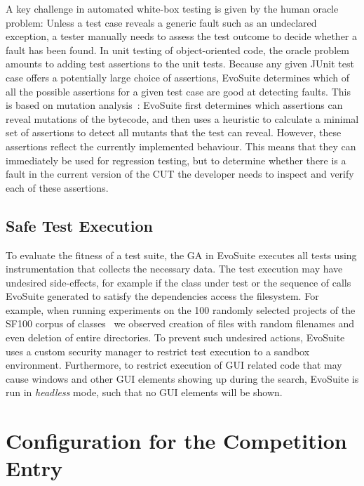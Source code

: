 \documentclass[10pt,conference,compsocconf]{IEEEtran}
\newcommand{\EVOSUITE}{{\sc EvoSuite}\xspace}
\newcommand{\CS}{{\sc SF100}\xspace}
\begin{document}
A key challenge in automated white-box testing is given by the human
oracle problem: Unless a test case reveals a generic fault such as an
undeclared exception, a tester manually needs to assess the test
outcome to decide whether a fault has been found. In unit testing of
object-oriented code, the oracle problem amounts to adding test
assertions to the unit tests. Because any given JUnit test case offers
a potentially large choice of assertions, \EVOSUITE determines which
of all the possible assertions for a given test case are good at
detecting faults. This is based on mutation
analysis~\cite{10.1109/TSE.2011.93}: \EVOSUITE first determines which
assertions can reveal mutations of the bytecode, and then uses a
heuristic to calculate a minimal set of assertions to detect all
mutants that the test can reveal. However, these assertions reflect
the currently implemented behaviour. This means that they can
immediately be used for regression testing, but to determine whether
there is a fault in the current version of the CUT the developer needs
to inspect and verify each of these assertions.

\subsection{Safe Test Execution}

To evaluate the fitness of a test suite, the GA in \EVOSUITE executes
all tests using instrumentation that collects the necessary data. The
test execution may have undesired side-effects, for example if the
class under test or the sequence of calls \EVOSUITE generated to
satisfy the dependencies access the filesystem. For example, when
running experiments on the 100 randomly selected projects of the \CS
corpus of classes~\cite{FrA12b} we observed creation of files with
random filenames and even deletion of entire directories. To prevent
such undesired actions, \EVOSUITE uses a custom security manager to
restrict test execution to a sandbox environment. Furthermore, to
restrict execution of GUI related code that may cause windows and
other GUI elements showing up during the search, \EVOSUITE is run in
\emph{headless} mode, such that no GUI elements will be shown.



\section{Configuration for the Competition Entry}
\end{document}
